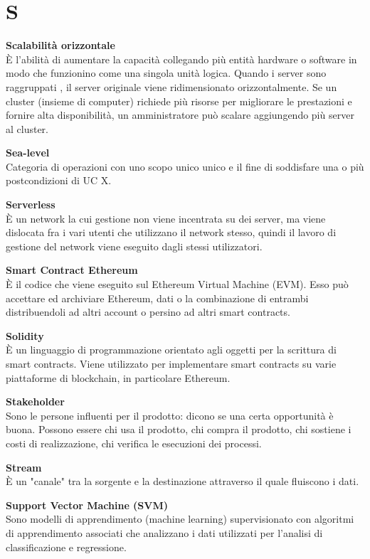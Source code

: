 \section{S}
\textbf{Scalabilità orizzontale}\\
È l'abilità di aumentare la capacità collegando più entità hardware o software in modo che funzionino come una singola unità logica. Quando i server sono raggruppati , il server originale viene ridimensionato orizzontalmente. Se un cluster (insieme di computer) richiede più risorse per migliorare le prestazioni e fornire alta disponibilità, un amministratore può scalare aggiungendo più server al cluster.

\textbf{Sea-level}\\
Categoria di operazioni con uno scopo unico unico e il fine di soddisfare una o più postcondizioni di UC X.

\textbf{Serverless}\\
È un network la cui gestione non viene incentrata su dei server, ma viene dislocata fra i vari utenti che utilizzano il network stesso, quindi il lavoro di gestione del network viene eseguito dagli stessi utilizzatori.

\textbf{Smart Contract Ethereum}\\
È il codice che viene eseguito sul Ethereum Virtual Machine (EVM). Esso può accettare ed archiviare Ethereum, dati o la combinazione di entrambi distribuendoli ad altri account o persino ad altri smart contracts.

\textbf{Solidity}\\
È un linguaggio di programmazione orientato agli oggetti per la scrittura di smart contracts. Viene utilizzato per implementare smart contracts su varie piattaforme di blockchain, in particolare Ethereum.

\textbf{Stakeholder}\\
Sono le persone influenti per il prodotto: dicono se una certa opportunità è buona. Possono essere chi usa il prodotto, chi compra il prodotto, chi sostiene i costi di realizzazione, chi verifica le esecuzioni dei processi.

\textbf{Stream}\\
È un "canale" tra la sorgente e la destinazione attraverso il quale fluiscono i dati.

\textbf{Support Vector Machine (SVM)}\\
Sono modelli di apprendimento (machine learning) supervisionato con algoritmi di apprendimento associati che analizzano i dati utilizzati per l'analisi di classificazione e regressione.

\clearpage